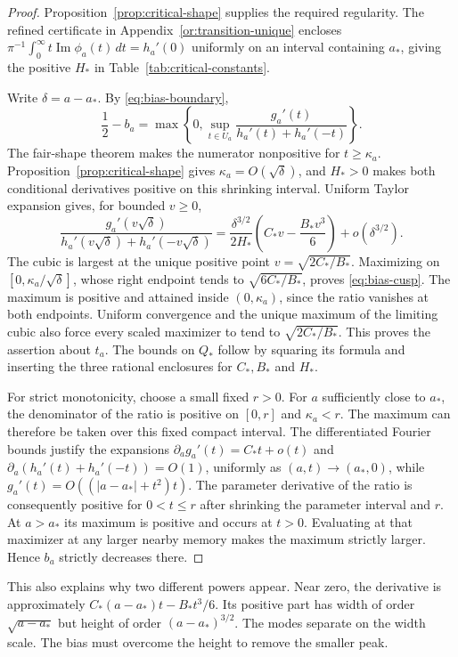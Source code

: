 \begin{proof}
Proposition~\ref{prop:critical-shape} supplies the required regularity.
The refined certificate in Appendix~\ref{or:transition-unique} encloses
$\pi^{-1}\int_0^\infty t\operatorname{Im}\phi_a(t)\,dt=h_a'(0)$
uniformly on an interval containing $a_*$, giving the positive $H_*$
in Table~\ref{tab:critical-constants}.

Write $\delta=a-a_*$. By \eqref{eq:bias-boundary},
\[
 \frac12-b_a=\max\left\{0,\sup_{t\in U_a}
     \frac{g_a'(t)}{h_a'(t)+h_a'(-t)}\right\}.
\]
The fair-shape theorem makes the numerator nonpositive for $t\ge \kappa_a$.
Proposition~\ref{prop:critical-shape} gives
$\kappa_a=O(\sqrt\delta)$, and $H_*>0$ makes both conditional derivatives
positive on this shrinking interval. Uniform Taylor expansion gives,
for bounded $v\ge0$,
\[
 \frac{g_a'(v\sqrt\delta)}{h_a'(v\sqrt\delta)+h_a'(-v\sqrt\delta)}
 =\frac{\delta^{3/2}}{2H_*}
       \left(C_*v-\frac{B_*v^3}{6}\right)+o(\delta^{3/2}).
\]
The cubic is largest at the unique positive point
$v=\sqrt{2C_*/B_*}$. Maximizing on $[0,\kappa_a/\sqrt\delta]$, whose
right endpoint tends to $\sqrt{6C_*/B_*}$, proves \eqref{eq:bias-cusp}.
The maximum is positive and attained inside $(0,\kappa_a)$, since the ratio
vanishes at both endpoints. Uniform convergence and the unique maximum
of the limiting cubic also force every scaled maximizer to tend to
$\sqrt{2C_*/B_*}$. This proves the assertion about $t_a$.
The bounds on $Q_*$ follow by squaring its formula and inserting the
three rational enclosures for $C_*,B_*$ and $H_*$.

For strict monotonicity, choose a small fixed
$r>0$. For $a$ sufficiently close to $a_*$, the denominator of the
ratio is positive on $[0,r]$ and $\kappa_a<r$. The maximum can therefore
be taken over this fixed compact interval.
The differentiated Fourier bounds justify the expansions
$\partial_a g_a'(t)=C_*t+o(t)$ and
$\partial_a(h_a'(t)+h_a'(-t))=O(1)$, uniformly as
$(a,t)\to(a_*,0)$, while
$g_a'(t)=O((|a-a_*|+t^2)t)$.
The parameter derivative of the ratio is consequently positive for
$0<t\le r$ after shrinking the parameter interval and $r$.
At $a>a_*$ its maximum is positive and occurs at $t>0$.
Evaluating at that maximizer at any larger nearby memory makes the
maximum strictly larger. Hence $b_a$ strictly decreases there.
\end{proof}

This also explains why two different powers appear. Near zero,
the derivative is approximately $C_*(a-a_*)t-B_*t^3/6$.
Its positive part has width of order $\sqrt{a-a_*}$ but height of
order $(a-a_*)^{3/2}$. The modes separate on the width scale.
The bias must overcome the height to remove the smaller peak.

